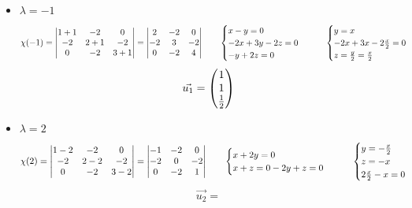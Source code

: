 \begin{itemize}
	\item $ \lambda = -1 $
    $$ \chi(-1) =
    \begin{vmatrix}
    	1 + 1 & -2 & 0 \\
        -2 & 2 + 1 & -2 \\
        0 & -2 & 3 + 1
    \end{vmatrix} =
    \begin{vmatrix}
    	2 & -2 & 0 \\
        -2 & 3 & -2 \\
        0 & -2 & 4
    \end{vmatrix} \qquad
    \begin{cases}
    	x - y = 0 \\
        -2x + 3y - 2z = 0 \\
        -y + 2z = 0
    \end{cases} \qquad
    \begin{cases}
    	y = x \\
        -2x + 3x - 2\half[x] = 0 \\
        z = \half[y] = \half[x]
    \end{cases} $$
    $$ \vec{u_1} =
    \begin{pmatrix}
    	1 \\
        1 \\
        \half
    \end{pmatrix} $$
    \item $ \lambda = 2 $
    $$ \chi(2) =
    \begin{vmatrix}
    	1 - 2 & -2 & 0 \\
        -2 & 2 - 2 & -2 \\
        0 & -2 & 3 - 2
    \end{vmatrix} =
    \begin{vmatrix}
    	-1 & -2 & 0 \\
        -2 & 0 & -2 \\
        0 & -2 & 1
    \end{vmatrix} \qquad
    \begin{cases}
    	x + 2y = 0 \\
        x + z = 0
        -2y + z = 0
    \end{cases} \qquad
    \begin{cases}
    	y = -\half[x] \\
        z = -x \\
        2\half[x] - x = 0
    \end{cases} $$
    $$ \vec{u_2} =
$$
\end{itemize}
